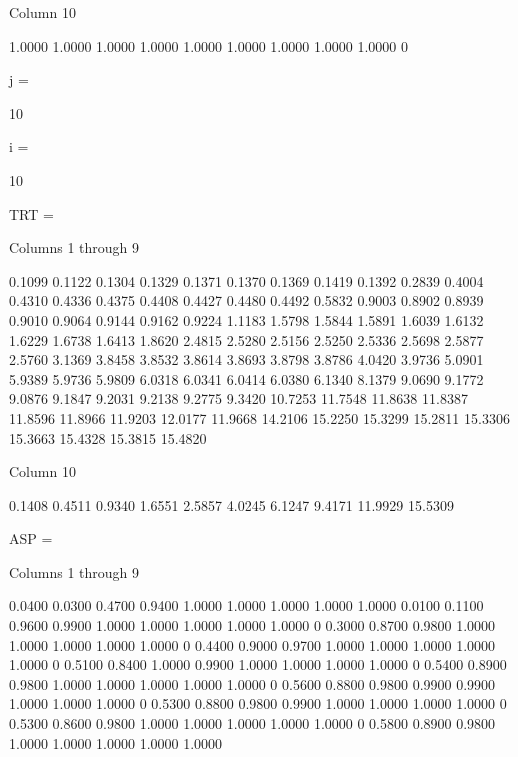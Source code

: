   Column 10

    1.0000
    1.0000
    1.0000
    1.0000
    1.0000
    1.0000
    1.0000
    1.0000
    1.0000
         0


j =

    10


i =

    10


TRT =

  Columns 1 through 9

    0.1099    0.1122    0.1304    0.1329    0.1371    0.1370    0.1369    0.1419    0.1392
    0.2839    0.4004    0.4310    0.4336    0.4375    0.4408    0.4427    0.4480    0.4492
    0.5832    0.9003    0.8902    0.8939    0.9010    0.9064    0.9144    0.9162    0.9224
    1.1183    1.5798    1.5844    1.5891    1.6039    1.6132    1.6229    1.6738    1.6413
    1.8620    2.4815    2.5280    2.5156    2.5250    2.5336    2.5698    2.5877    2.5760
    3.1369    3.8458    3.8532    3.8614    3.8693    3.8798    3.8786    4.0420    3.9736
    5.0901    5.9389    5.9736    5.9809    6.0318    6.0341    6.0414    6.0380    6.1340
    8.1379    9.0690    9.1772    9.0876    9.1847    9.2031    9.2138    9.2775    9.3420
   10.7253   11.7548   11.8638   11.8387   11.8596   11.8966   11.9203   12.0177   11.9668
   14.2106   15.2250   15.3299   15.2811   15.3306   15.3663   15.4328   15.3815   15.4820

  Column 10

    0.1408
    0.4511
    0.9340
    1.6551
    2.5857
    4.0245
    6.1247
    9.4171
   11.9929
   15.5309


ASP =

  Columns 1 through 9

    0.0400    0.0300    0.4700    0.9400    1.0000    1.0000    1.0000    1.0000    1.0000
    0.0100    0.1100    0.9600    0.9900    1.0000    1.0000    1.0000    1.0000    1.0000
         0    0.3000    0.8700    0.9800    1.0000    1.0000    1.0000    1.0000    1.0000
         0    0.4400    0.9000    0.9700    1.0000    1.0000    1.0000    1.0000    1.0000
         0    0.5100    0.8400    1.0000    0.9900    1.0000    1.0000    1.0000    1.0000
         0    0.5400    0.8900    0.9800    1.0000    1.0000    1.0000    1.0000    1.0000
         0    0.5600    0.8800    0.9800    0.9900    0.9900    1.0000    1.0000    1.0000
         0    0.5300    0.8800    0.9800    0.9900    1.0000    1.0000    1.0000    1.0000
         0    0.5300    0.8600    0.9800    1.0000    1.0000    1.0000    1.0000    1.0000
         0    0.5800    0.8900    0.9800    1.0000    1.0000    1.0000    1.0000    1.0000

